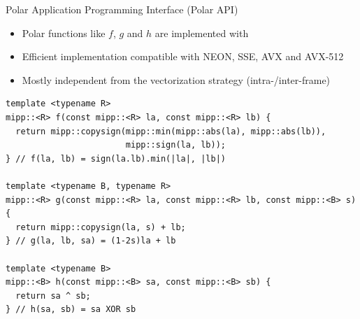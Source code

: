 
\begin{frame}{Polar Application Programming Interface (Polar API)}
  \vspace{-0.2cm}
  \begin{itemize}
    \item Polar functions like $f$, $g$ and $h$ are implemented with \MIPP
    \item Efficient implementation compatible with NEON, SSE, AVX and AVX-512
    \item Mostly independent from the vectorization strategy (intra-/inter-frame)
  \end{itemize}
  \begin{verbatim}
template <typename R>
mipp::<R> f(const mipp::<R> la, const mipp::<R> lb) {
  return mipp::copysign(mipp::min(mipp::abs(la), mipp::abs(lb)),
                        mipp::sign(la, lb));
} // f(la, lb) = sign(la.lb).min(|la|, |lb|)

template <typename B, typename R>
mipp::<R> g(const mipp::<R> la, const mipp::<R> lb, const mipp::<B> s) {
  return mipp::copysign(la, s) + lb;
} // g(la, lb, sa) = (1-2s)la + lb

template <typename B>
mipp::<B> h(const mipp::<B> sa, const mipp::<B> sb) {
  return sa ^ sb;
} // h(sa, sb) = sa XOR sb
  \end{verbatim}
\end{frame}

